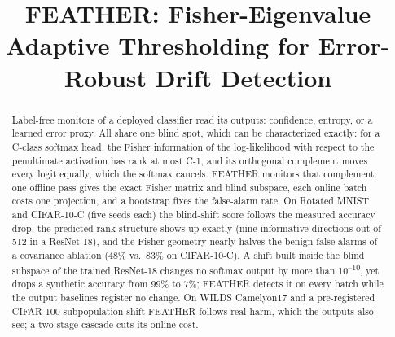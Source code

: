 \documentclass[conference]{IEEEtran}
\begin{document}
\title{FEATHER: Fisher-Eigenvalue Adaptive Thresholding for Error-Robust Drift Detection}

\author{
\and
{}
\and
{}
}

\maketitle

\begin{abstract}
Label-free monitors of a deployed classifier read its outputs: confidence,
entropy, or a learned error proxy. All share one blind spot, which can be
characterized exactly: for a C-class softmax head, the Fisher information of
the log-likelihood with respect to the penultimate activation has rank at most
C-1, and its orthogonal complement moves every logit equally, which the
softmax cancels. FEATHER monitors that complement: one offline pass gives the
exact Fisher matrix and blind subspace, each online batch costs one
projection, and a bootstrap fixes the false-alarm rate. On Rotated MNIST and
CIFAR-10-C (five seeds each) the blind-shift score follows the measured
accuracy drop, the predicted rank structure shows up exactly (nine informative
directions out of 512 in a ResNet-18), and the Fisher geometry nearly halves
the benign false alarms of a covariance ablation (48\% vs.\ 83\% on
CIFAR-10-C). A shift built inside the blind subspace of the trained ResNet-18
changes no softmax output by more than 10\textsuperscript{--10}, yet drops a
synthetic accuracy from 99\% to 7\%; FEATHER detects it on every batch while the
output baselines register no change. On WILDS Camelyon17 and a pre-registered
CIFAR-100 subpopulation shift FEATHER follows real harm, which the outputs
also see; a two-stage cascade cuts its online cost.
\end{abstract}
\end{document}
